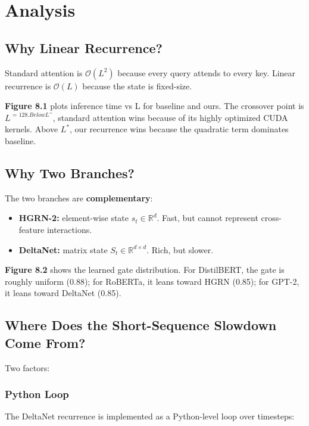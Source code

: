 \section{Analysis}

\subsection{Why Linear Recurrence?}

Standard attention is $\mathcal{O}(L^2)$ because every query attends to every 
key. Linear recurrence is $\mathcal{O}(L)$ because the state is fixed-size.

\textbf{Figure 8.1} plots inference time vs L for baseline and ours. The 
crossover point is $L^\textit{ = 128$. Below $L^}$, standard attention 
wins because of its highly optimized CUDA kernels. Above $L^*$, our 
recurrence wins because the quadratic term dominates baseline.

\subsection{Why Two Branches?}

The two branches are \textbf{complementary}:

\begin{itemize}
\item \textbf{HGRN-2:} element-wise state $s_t \in \mathbb{R}^d$. Fast, but cannot
  represent cross-feature interactions.
\item \textbf{DeltaNet:} matrix state $S_t \in \mathbb{R}^{d \times d}$. Rich, but
  slower.

\end{itemize}
\textbf{Figure 8.2} shows the learned gate distribution. For DistilBERT, the gate 
is roughly uniform (0.88); for RoBERTa, it leans toward HGRN 
(0.85); for GPT-2, it leans toward DeltaNet (0.85).

\subsection{Where Does the Short-Sequence Slowdown Come From?}

Two factors:

\subsubsection{Python Loop}

The DeltaNet recurrence is implemented as a Python-level loop over timesteps:


